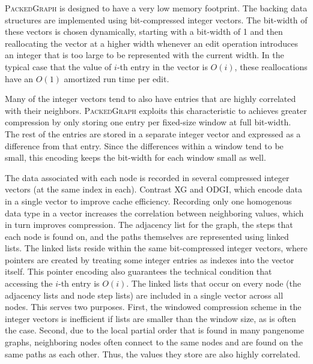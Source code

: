 \documentclass[11pt]{ucthesis}
\begin{document}
\textsc{PackedGraph} is designed to have a very low memory footprint.
The backing data structures are implemented using bit-compressed integer vectors.
The bit-width of these vectors is chosen dynamically, starting with a bit-width of 1 and  then reallocating the vector at a higher width whenever an edit operation introduces an integer that is too large to be represented with the current width.
In the typical case that the value of $i$-th entry in the vector is $O(i)$, these reallocations have an  $O(1)$ amortized run time per edit.

Many of the integer vectors tend to also have entries that are highly correlated with their neighbors.
\textsc{PackedGraph} exploits this characteristic to achieves greater compression by only storing one entry per fixed-size window at full bit-width.
 The rest of the entries are stored in a separate integer vector and expressed as a difference from that entry.
 Since the differences within a window tend to be small, this encoding keeps the bit-width for each window small as well.

The data associated with each node is recorded in several compressed integer vectors (at the same index in each).
Contrast \textsc{XG} and \textsc{{ODGI}}, which encode data in a single vector to improve cache efficiency.
Recording only one homogenous data type in a vector increases the correlation between neighboring values, which in turn improves compression.
The adjacency list for the graph, the steps that each node is found on, and the paths themselves are represented using linked lists.
The linked lists reside within the same bit-compressed integer vectors, where pointers are created by treating some integer entries as indexes into the vector itself.
This pointer encoding also guarantees the technical condition that accessing the $i$-th entry is $O(i)$.
The linked lists that occur on every node (the adjacency lists and node step lists) are included in a single vector across all nodes.
This serves two purposes.
First, the windowed compression scheme in the integer vectors is inefficient if lists are smaller than the window size, as is often the case.
Second, due to the local partial order that is found in many pangenome graphs, neighboring nodes often connect to the same nodes and are found on the same paths as each other.
Thus, the values they store are also highly correlated.
\end{document}
